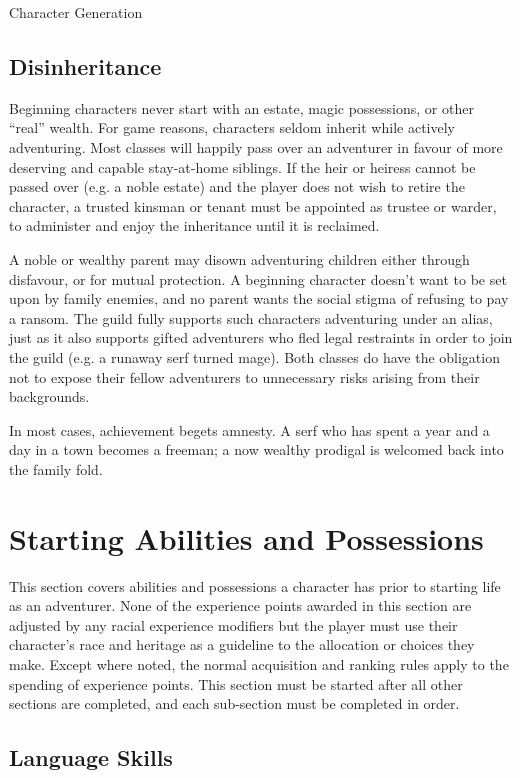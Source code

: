 \begin{Chapter}{Character Generation}
\subsection{Disinheritance}

Beginning characters never start with an estate, magic possessions, or
other “real” wealth.  For game reasons, characters seldom inherit
while actively adventuring.  Most classes will happily pass over an
adventurer in favour of more deserving and capable stay-at-home
siblings.  If the heir or heiress cannot be passed over (e.g. a noble
estate) and the player does not wish to retire the character, a
trusted kinsman or tenant must be appointed as trustee or warder, to
administer and enjoy the inheritance until it is reclaimed.

A noble or wealthy parent may disown adventuring children either
through disfavour, or for mutual protection.  A beginning character
doesn’t want to be set upon by family enemies, and no parent wants the
social stigma of refusing to pay a ransom.  The guild fully supports
such characters adventuring under an alias, just as it also supports
gifted adventurers who fled legal restraints in order to join the
guild (e.g. a runaway serf turned mage).  Both classes do have the
obligation not to expose their fellow adventurers to unnecessary risks
arising from their backgrounds.

In most cases, achievement begets amnesty.  A serf who has spent a
year and a day in a town becomes a freeman; a now wealthy prodigal is
welcomed back into the family fold.


\section{Starting Abilities and Possessions}
\label{starting}

This section covers abilities and possessions a character has prior to
starting life as an adventurer.  None of the experience points awarded
in this section are adjusted by any racial experience modifiers but
the player must use their character’s race and heritage as a guideline
to the allocation or choices they make. Except where noted, the normal
acquisition and ranking rules apply to the spending of experience
points.  This section must be started after all other sections are
completed, and each sub-section must be completed in order.

\subsection{Language Skills}


\end{Chapter}
